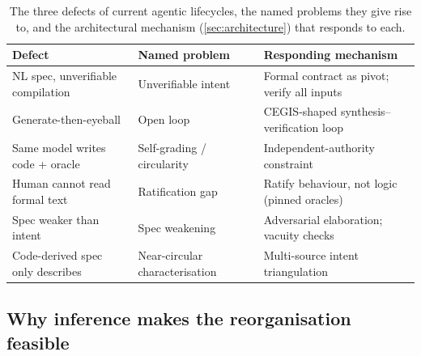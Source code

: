 \begin{table}[t]
\centering
\caption{The three defects of current agentic lifecycles, the named problems they give rise to, and the architectural mechanism (\cref{sec:architecture}) that responds to each.}
\label{tab:defect-mechanism}
\begin{tabular}{@{}lll@{}}
\toprule
Defect & Named problem & Responding mechanism \\
\midrule
NL spec, unverifiable compilation & Unverifiable intent & Formal contract as pivot; verify all inputs \\
Generate-then-eyeball & Open loop & CEGIS-shaped synthesis--verification loop \\
Same model writes code + oracle & Self-grading / circularity & Independent-authority constraint \\
Human cannot read formal text & Ratification gap & Ratify behaviour, not logic (pinned oracles) \\
Spec weaker than intent & Spec weakening & Adversarial elaboration; vacuity checks \\
Code-derived spec only describes & Near-circular characterisation & Multi-source intent triangulation \\
\bottomrule
\end{tabular}
\end{table}

\subsection{Why inference makes the reorganisation feasible}
\label{subsec:inference-bootstrap}

